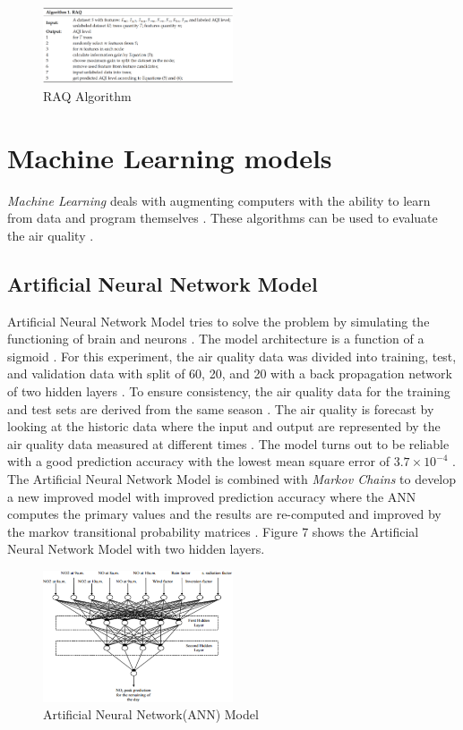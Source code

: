 \documentclass[sigconf]{acmart}
\begin{document}
\begin{figure}
\includegraphics[width=0.5\textwidth]{images/fig6.png}
\caption{RAQ Algorithm \cite{raq2016}}
\end{figure}

\section{Machine Learning models}
{\em Machine Learning} deals with augmenting computers with the ability to learn from data and program themselves \cite{gagan2017}. These algorithms can be used to evaluate the air quality \cite{gagan2017}. 

\subsection{Artificial Neural Network Model}
Artificial Neural Network Model tries to solve the problem by simulating the functioning of brain and neurons \cite{gagan2017}. The model architecture is a function of a sigmoid \cite{gagan2017}. For this experiment, the air quality data was divided into training, test, and validation data with  split of 60, 20, and 20 with a back propagation network of two hidden layers \cite{gagan2017}. To ensure consistency, the air quality data for the training and test sets are derived from the same season \cite{gagan2017}. The air quality is forecast by looking at the historic data where the input and output are represented by the air quality data measured at different times \cite{gagan2017}. The model turns out to be reliable with a good prediction accuracy with the lowest mean square error of $3.7 \times 10^{-4}$ \cite{gagan2017}. The Artificial Neural Network Model is combined with {\em Markov Chains} to develop a new improved model with improved prediction accuracy where the ANN computes the primary values and the results are re-computed and improved by the markov transitional probability matrices \cite{gagan2017}. Figure 7 shows the Artificial Neural Network Model with two hidden layers. 

\begin{figure}
\includegraphics[width=0.5\textwidth]{images/fig7.png}
\caption{Artificial Neural Network(ANN) Model \cite{gagan2017}}
\end{figure}
\end{document}
